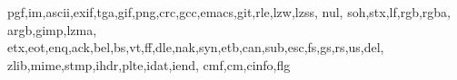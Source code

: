 \newcommand{\charnodeoffset}{1.0cm}

\newcommand{\nodechar}[2]{\node[below=of #1, yshift=\charnodeoffset] {\texttt{#2}};}

\newcommand{\firstcharnode}[3]{  \node (#1) [hnode] {#2};
  \nodechar{#1}{\texttt{#3}}}

\newcommand{\restcharnode}[4]{
  \node (#1) [hnode,right=of #2] {#3};
  \nodechar{#1}{\texttt{#4}}
}

\newcommand*\algohack{\addtocontents{loa}{\vskip 9pt}}


\newcommand*\acronymstyle{\scshape}
\newcommand*\newacronym[1]{
  \expandafter\newcommand\csname#1\endcsname[1][]{{\acronymstyle#1}##1\xspace}}

\newcommand*{\newacronyms}{%
  \let\do\newacronym
  \docsvlist
}
\newacronyms{pgf,im,ascii,exif,tga,gif,png,crc,gcc,emacs,git,rle,lzw,lzss,
nul, soh,stx,lf,rgb,rgba, argb,gimp,lzma,
etx,eot,enq,ack,bel,bs,vt,ff,dle,nak,syn,etb,can,sub,esc,fs,gs,rs,us,del,
zlib,mime,stmp,ihdr,plte,idat,iend,
cmf,cm,cinfo,flg}

\newcommand*{\lzone}{{\acronymstyle lz\oldstylenums{77}}\xspace}
\newcommand*{\lztwo}{{\acronymstyle lz\oldstylenums{78}}\xspace}

\newcommand*{\cret}{{\acronymstyle cr}\xspace}
\newcommand*{\htab}{{\acronymstyle ht}\xspace}
\newcommand*{\nullm}{{\acronymstyle null}\xspace}
\newcommand*{\lzfam}{{\acronymstyle lz}-family\xspace}
\newcommand*{\sout}{{\acronymstyle so}\xspace}
\newcommand*{\shiftin}{{\acronymstyle si}\xspace}
\newcommand*{\emed}{{\acronymstyle em}\xspace}

\newcommand*{\crlf}{{\acronymstyle crlf}\xspace}


\newcommand*{\dc}[1]{{\acronymstyle dc#1}\xspace}

\newcommand*{\crcst}{{\acronymstyle crc-16}\xspace}

\newcommand{\deflate}{Deflate\xspace}

\newenvironment{samepagew}{\begin{minipage}{\textwidth}}{\end{minipage}}


